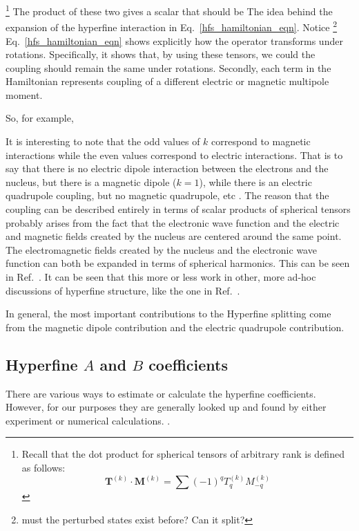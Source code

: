 \footnote{Recall that the dot product for spherical tensors of arbitrary rank is defined as follows:
\begin{equation}
\mathbf{T}^{(k)}\cdot\mathbf{M}^{(k)}=\sum (-1)^qT_q^{(k)}M_{-q}^{(k)}
\end{equation}
}
\cite{sobelman_spectra}
The product of these two gives a scalar that should be
The idea behind the expansion of the hyperfine interaction in Eq.\ \ref{hfs_hamiltonian_eqn}.
Notice \footnote{must the perturbed states exist before? Can it split?} Eq.\ \ref{hfs_hamiltonian_eqn} shows explicitly how the operator transforms under rotations. Specifically, it shows that, by using these tensors, we could the coupling should remain the same under rotations.
Secondly, each term in the Hamiltonian represents coupling of a different electric or magnetic multipole moment. 

So, for example, 


It is interesting to note that the odd values of $k$ correspond to magnetic interactions while the even values correspond to electric interactions. That is to say that there is no electric dipole interaction between the electrons and the nucleus, but there is a magnetic dipole ($k=1$), while there is an electric quadrupole coupling, but no magnetic quadrupole, etc
\cite{experimental_hyperfine_alkali_arimondo}
.
The reason that the coupling can be described entirely in terms of scalar products of spherical tensors probably arises from the fact that the electronic wave function and the electric and magnetic fields created by the nucleus are centered around the same point. The electromagnetic fields created by the nucleus and the electronic wave function can both be expanded in terms of spherical harmonics. This can be seen in Ref.\ \cite{schwartz_hyperfine_expansion}. It can be seen that this more or less work in other, more ad-hoc discussions of hyperfine structure, like the one in Ref.\ \cite{cuaMITnotes}. 

In general, the most important contributions to the Hyperfine splitting come from the magnetic dipole contribution and the electric quadrupole contribution. 


\subsection{Hyperfine $A$ and $B$ coefficients}
There are various ways to estimate or calculate the hyperfine coefficients. However, for our purposes they are generally looked up and found by either experiment or numerical calculations. \cite{cuaMITnotes}. 


